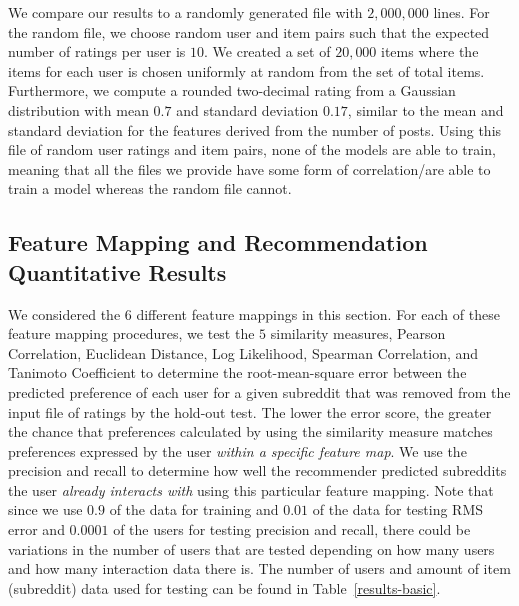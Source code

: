\documentclass{article}
\begin{document}
We compare our results to a randomly generated file with $2,000,000$ lines. For the random file, we choose random user and item pairs such that the expected number of ratings per user is $10$. We created a set of $20,000$ items
where the items for each user is chosen uniformly at random from the set of total items. Furthermore, we compute a 
rounded two-decimal rating from a Gaussian distribution with mean $0.7$ and standard deviation $0.17$, similar to the mean and standard deviation for the features derived from the number of posts. Using this
file of random user ratings and item pairs, none of the models are able to train, meaning that all the files
we provide have some form of correlation/are able to train a model whereas the random file cannot.

\subsection{Feature Mapping and Recommendation Quantitative Results}\label{sec:feature-mapping}

We considered the $6$ different feature mappings in this section. For each of these
feature mapping procedures, we test the $5$ similarity measures, Pearson Correlation, Euclidean Distance, Log Likelihood, 
Spearman Correlation, and Tanimoto Coefficient to determine the root-mean-square error between the predicted 
preference of each user for a given subreddit that was removed from the input file of ratings
by the hold-out test. The lower the error score, the 
greater the chance that preferences calculated by using the similarity measure matches preferences expressed 
by the user \emph{within a specific feature map}. We use the precision and recall to determine how well the recommender
predicted subreddits the user \emph{already interacts with} using 
this particular feature mapping. Note that since we use $0.9$ of the data for training
and $0.01$ of the data for testing RMS error and $0.0001$ of the users for testing precision and recall, there
could be variations in the number of users that are tested depending on how many users
and how many interaction data there is. The number of users and amount 
of item (subreddit) data used for testing can be found in
Table~\ref{results-basic}.
\end{document}
